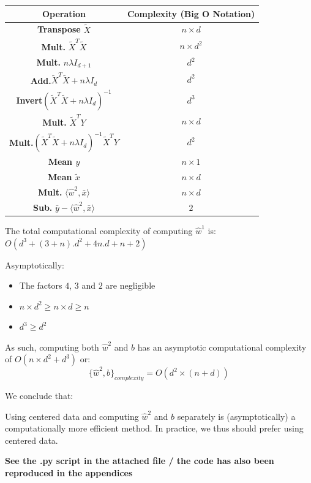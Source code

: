 \documentclass{homework}
\begin{document}
\begin{center}
\begin{tabular}{ | c | c | } 
\hline
\textbf{Operation} & \textbf{Complexity} (Big O Notation) \\
\hline
\textbf{Transpose} $\tilde{X}$ & $n\times d$ \\
\hline
\textbf{Mult.} $\tilde{X}^T\tilde{X}$ & $n\times d^2$ \\
\hline
\textbf{Mult.} $n\lambda I_{d+1}$ & $d^2$ \\
\hline
\textbf{Add.}$\tilde{X}^T\tilde{X}+n\lambda I_{d}$ & $d^2$ \\
\hline
\textbf{Invert}$(\tilde{X}^T\tilde{X}+n\lambda I_{d})^{-1}$ & $d^3$ \\
\hline
\textbf{Mult.} $\tilde{X}^TY$ &  $n\times d$ \\
\hline
\textbf{Mult.}$(\tilde{X}^T\tilde{X}+n\lambda I_{d})^{-1}\tilde{X}^TY$ & $d^2$ \\
\hline
\textbf{Mean $y$} & $n\times1$ \\
\hline
\textbf{Mean $\tilde{x}$} & $n\times d$ \\
\hline
\textbf{Mult.} $\langle\hat{w}^2,\bar{x}\rangle$ &  $n\times d$ \\
\hline
\textbf{Sub.} $\bar{y} - \langle\hat{w}^2,\bar{x}\rangle$ &  $2$ \\
\hline
\end{tabular}
\end{center}
The total computational complexity of computing $\hat{w}^1$ is: $O(d^3+(3+n).d^2+4n.d+n+2)$

Asymptotically:
\begin{itemize}
    \item The factors $4$, $3$ and $2$ are negligible
    \item $n\times d^2 \ge n\times d \ge n$
    \item $d^3 \ge d^2$
\end{itemize}

As such, computing both $\hat{w}^2$ and $b$ has an asymptotic computational complexity of $O(n\times d^2 + d^3)$ or:
$${\{\hat{w}^2}, b\}_{complexity}=O(d^2\times(n+d))$$

We conclude that: 

\textcolor{OliveGreen}{Using centered data and computing $\hat{w}^2$ and $b$ separately is (asymptotically) 
a computationally more efficient method. In practice, we thus should prefer using centered data.}

\small{\textbf{See the .py script in the attached file / the code has also been reproduced in the appendices}}
\end{document}

